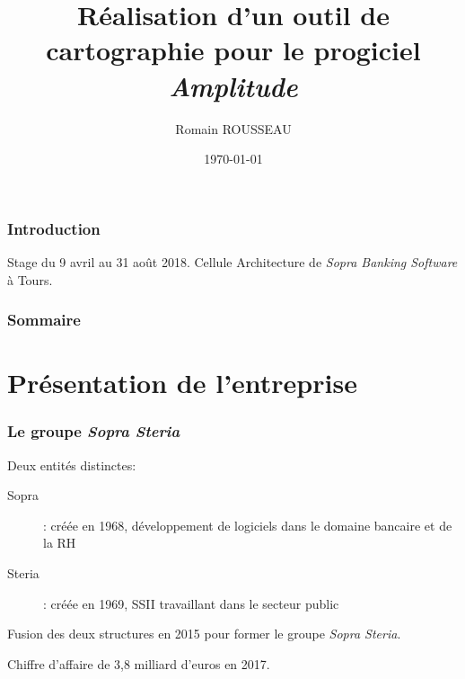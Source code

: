 \documentclass{beamer}
\title{Réalisation d'un outil de cartographie pour le progiciel \textit{Amplitude}}
\author{Romain ROUSSEAU}
\institute{Sopra Banking Software}
\date{\today}
\begin{document}
	
	
\begin{frame}[plain]
	\titlepage
\end{frame}




\begin{frame}[plain]
\frametitle{Introduction}

Stage du 9 avril au 31 août 2018.
\bigbreak
Cellule Architecture de \textit{Sopra Banking Software} à Tours.

\end{frame}


\begin{frame}

\frametitle{Sommaire}

\tableofcontents

\end{frame}

\section{Présentation de l'entreprise}

\begin{frame}
\frametitle{Le groupe \textit{Sopra Steria}}

\begin{block}{Deux entités distinctes:}
	\begin{description}
		\item[Sopra] : créée en 1968, développement de logiciels dans le domaine bancaire et de la RH
		\item[Steria] : créée en 1969, SSII travaillant dans le secteur public
	\end{description}
\end{block}

\bigbreak 

Fusion des deux structures en 2015 pour former le groupe \textit{Sopra Steria}.

\bigbreak

Chiffre d'affaire de 3,8 milliard d'euros en 2017.

\end{frame}
\end{document}
